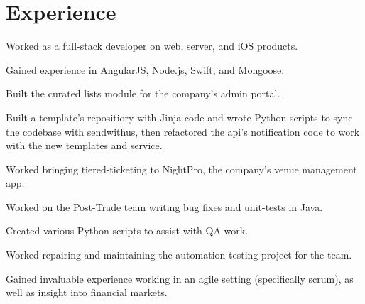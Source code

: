 \documentclass[]{resume}
\begin{document}
\begin{minipage}[t]{0.66\textwidth}


\section{Experience}

\vspace{\topsep} %
\begin{tightemize} \item Worked as a full-stack developer on web, server, and iOS products. \item Gained experience in AngularJS, Node.js, Swift, and Mongoose. \item Built the curated lists module for the company's admin portal. \item Built a template's repositiory with Jinja code and wrote Python scripts to sync the codebase with sendwithus, then refactored the api's notification code to work with the new templates and service. \item Worked bringing tiered-ticketing to NightPro, the company's venue management app. \end{tightemize}
\sectionsep

\begin{tightemize} \item Worked on the Post-Trade team writing bug fixes and unit-tests in Java. \item Created various Python scripts to assist with QA work. \item Worked repairing and maintaining the automation testing project for the team. \item Gained invaluable experience working in an agile setting (specifically scrum), as well as insight into financial markets. \end{tightemize}
\sectionsep


\end{minipage}
\end{document}
